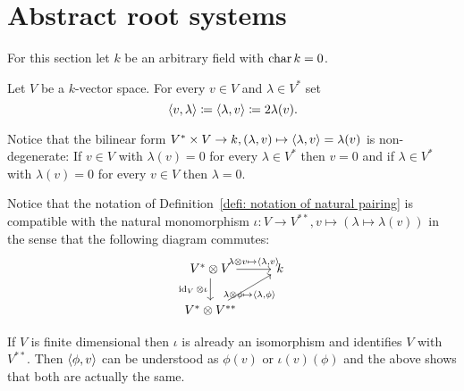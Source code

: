 \section{Abstract root systems}
For this section let $k$ be an arbitrary field with $\operatorname{char} k = 0$.


\begin{defi}\label{defi: notation of natural pairing}
 Let $V$ be a $k$-vector space. For every $v \in V$ and $\lambda \in V^*$ set
 \[
  \left\langle v, \lambda\right\rangle \coloneqq \left\langle \lambda, v\right\rangle \coloneqq2 \lambda(v).
 \]
\end{defi}


\begin{rem}\label{rem: natural pairing is nondegenerate}
 Notice that the bilinear form $V^* \times V \to k, (\lambda,  v) \mapsto \left\langle \lambda, v\right\rangle = \lambda(v)$ is non-degenerate: If $v \in V$ with $\lambda(v) = 0$ for every $\lambda \in V^*$ then $v = 0$ and if $\lambda \in V^*$ with $\lambda(v) = 0$ for every $v \in V$ then $\lambda = 0$.
\end{rem}


\begin{rem}
 Notice that the notation of Definition~\ref{defi: notation of natural pairing} is compatible with the natural monomorphism $\iota \colon V \to V^{**}, v \mapsto (\lambda \mapsto \lambda(v))$ in the sense that the following diagram commutes:
 \[
   \begin{tikzcd}
     V^* \otimes V
     \arrow{r}[above]{\lambda \otimes v \mapsto \pair{\lambda, v}}
     \arrow{d}[left]{\id_V \otimes \iota}
     &
     k
     \\
     V^* \otimes V^{**}
     \arrow{ur}[below]{\lambda \otimes \phi \mapsto \pair{\lambda, \phi}}
     &
     {}
   \end{tikzcd}
 \]
 
 If $V$ is finite dimensional then $\iota$ is already an isomorphism and identifies $V$ with $V^{**}$. Then $\left\langle \phi, v\right\rangle$ can be understood as $\phi(v)$ or $\iota(v)(\phi)$ and the above shows that both are actually the same.
\end{rem}


